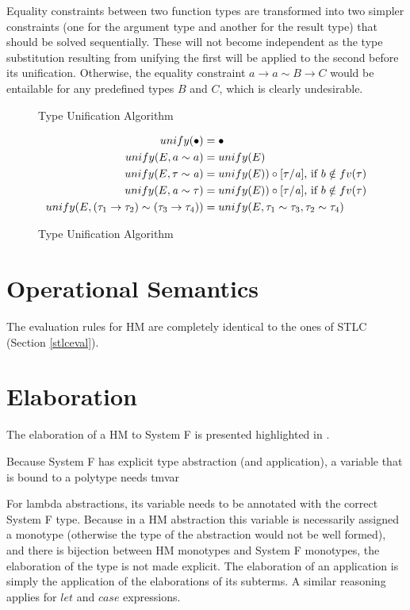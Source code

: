 Equality constraints between two function types are transformed into two simpler constraints (one for the argument type and another for the result type) that should be solved sequentially. These will not become independent as the type substitution resulting from unifying the first will be applied to the second before its unification. Otherwise, the equality constraint $a\to a \sim B \to C$ would be entailable for any predefined types $B$ and $C$, which is clearly undesirable.
\begin{figure}
  \begin{flushleft}  

                {Type Unification Algorithm}
\end{flushleft}
  \begin{align}
  unify(\bullet)&=\bullet\\
  unify(E, a \sim a) &= unify(E)           \\
  unify(E, \mathit{\tau} \sim \mathit{a})&= unify(E)) \circ [\mathit{\tau}/\mathit{a}]\text{, if $b \notin fv(\mathit{\tau})$}\\
  unify(E, \mathit{a} \sim \mathit{\tau}) &= unify(E)) \circ [\mathit{\tau}/\mathit{a}]\text{, if $b \notin fv(\mathit{\tau})$}\\
  unify(E, (\mathit{\tau}_1 \to \mathit{\tau}_2) \sim (\mathit{\tau}_3 \to \mathit{\tau}_4)) &= unify(E,\mathit{\tau}_1 \sim \mathit{\tau}_3,\mathit{\tau}_2 \sim \mathit{\tau}_4)
  \end{align}
  \caption{Type Unification Algorithm}
  \label{unification}
\end{figure}
\section{Operational Semantics}
The evaluation rules for HM are completely identical to the ones of STLC (Section \ref{stlceval}).
\section{Elaboration}
\label{hmelab}
The elaboration of a HM to System F is presented highlighted in .

Because System F has explicit type abstraction (and application), a variable that is bound to a polytype needs tmvar

For lambda abstractions, its variable needs to be annotated with the correct System F type. Because in a HM abstraction this variable is necessarily assigned a monotype (otherwise the type of the abstraction would not be well formed), and there is bijection between HM monotypes and System F monotypes, the elaboration of the type is not made explicit. The elaboration of an application is simply the application of the elaborations of its subterms. A similar reasoning applies for $let$ and $case$ expressions.

